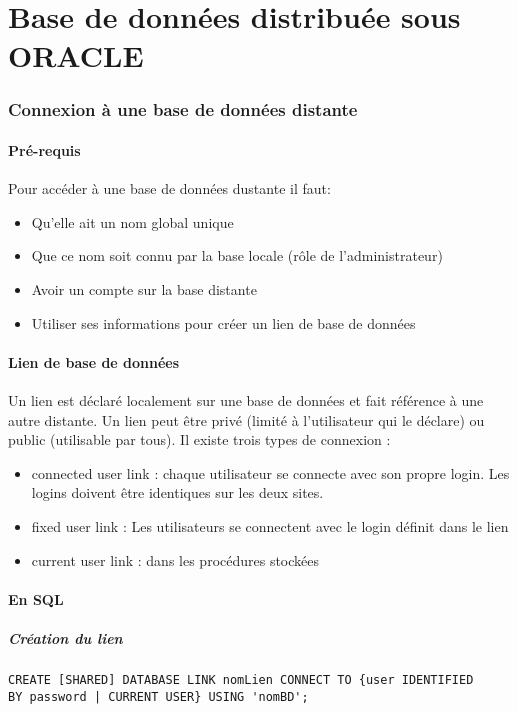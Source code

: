 \documentclass[10pt,a4paper,twoside]{article}
\begin{document}
\newpage
\part{Base de données distribuée sous ORACLE}

\section{Connexion à une base de données distante}
\subsection{Pré-requis}
Pour accéder à une base de données dustante il faut:
\begin{itemize}
\item Qu'elle ait un nom global unique
\item Que ce nom soit connu par la base locale (rôle de l'administrateur)
\item Avoir un compte sur la base distante
\item Utiliser ses informations pour créer un lien de base de données
\end{itemize}

\subsection{Lien de base de données}
Un lien est déclaré localement sur une base de données et fait référence à une autre distante. Un lien peut être privé (limité à l'utilisateur qui le déclare) ou public (utilisable par tous). Il existe trois types de connexion :
\begin{itemize}
\item connected user link : chaque utilisateur se connecte avec son propre login. Les logins doivent être identiques sur les deux sites.
\item fixed user link : Les utilisateurs se connectent avec le login définit dans le lien
\item current user link : dans les procédures stockées
\end{itemize}

\subsection{En SQL}
\subsubsection{Création du lien}
\begin{verbatim}
CREATE [SHARED] DATABASE LINK nomLien CONNECT TO {user IDENTIFIED
BY password | CURRENT USER} USING 'nomBD';
\end{verbatim}
\end{document}
